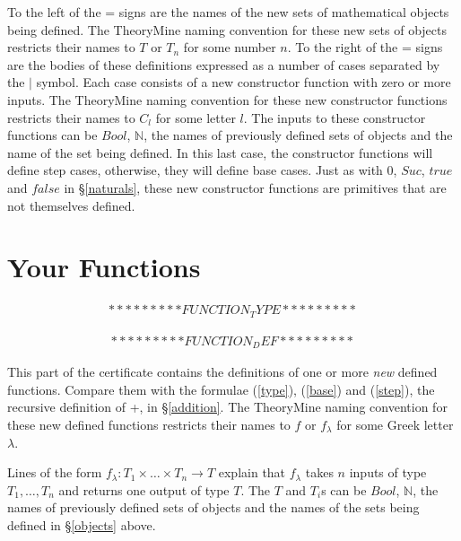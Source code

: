 \documentclass[twocolumn]{article}
\newcommand{\nat}{\mathbb{N}}
\begin{document}
To the left of the = signs are the names of the new sets of mathematical objects
being defined.  The TheoryMine naming convention for these new sets of objects
restricts their names to $T$ or $T_n$ for some number $n$. To the right of the =
signs are the bodies of these definitions expressed as a number of cases
separated by the $|$ symbol. Each case consists of a new constructor function
with zero or more inputs. The TheoryMine naming convention for these new
constructor functions restricts their names to $C_l$ for some letter $l$. The
inputs to these constructor functions can be $Bool$, $\nat$, the names of previously
defined sets of objects and the name of the set being defined. In this last
case, the constructor functions will define step cases, otherwise, they will
define base cases. Just as with $0$, $Suc$, $true$ and $false$ in
\S\ref{naturals}, these new constructor functions are primitives that are not
themselves defined.

\section{Your Functions}
\label{functions}

\begin{eqnarray*}
*********FUNCTION_TYPE*********
\end{eqnarray*}

\begin{eqnarray*}
*********FUNCTION_DEF*********
\end{eqnarray*}

This part of the certificate contains the definitions of one or more {\em new}
defined functions. Compare them with the formulae (\ref{type}), (\ref{base})
and (\ref{step}), the recursive definition of +, in \S\ref{addition}. The
TheoryMine naming convention for these new defined functions restricts their
names to $f$ or $f_{\lambda}$ for some Greek letter $\lambda$.

Lines of the form $f_{\lambda} : T_1 \times \ldots \times T_n \rightarrow T$
explain that $f_{\lambda}$ takes $n$ inputs of type $T_1, \ldots, T_n$ and
returns one output of type $T$. The $T$ and $T_i$s can be $Bool$, $\nat$, the names of
previously defined sets of objects and the names of the sets being defined in
\S\ref{objects} above. 
\end{document}

